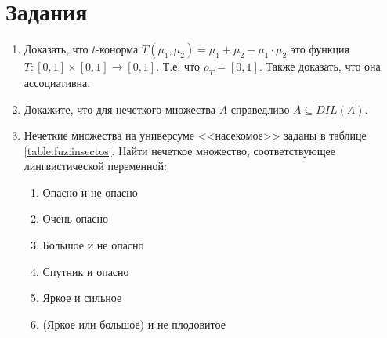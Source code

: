 \section*{Задания}

\begin{enumerate}
    
    \item Доказать, что $t$-конорма $T(\mu_1,\mu_2)=\mu_1+\mu_2-\mu_1\cdot\mu_2$ это функция $T:[0,1]\times[0,1]\to[0,1]$. Т.е. что $\rho_T=[0,1]$. Также доказать, что она ассоциативна.
    
    \item Докажите, что для нечеткого множества $A$ справедливо $A\subseteq DIL(A)$.
    
    \item Нечеткие множества на универсуме <<насекомое>> заданы в таблице \ref{table:fuz:insectos}. Найти нечеткое множество, соответствующее лингвистической переменной:
    \begin{enumerate}
        \item Опасно и не опасно
        \item Очень опасно
        \item Большое и не опасно
        \item Спутник и опасно
        \item Яркое и сильное
        \item (Яркое или большое) и не плодовитое
    \end{enumerate}


\end{enumerate}
